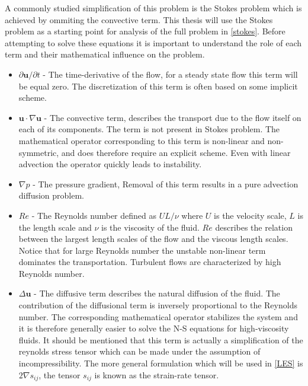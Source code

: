 A commonly studied simplification of this problem is the Stokes problem which
is achieved by ommiting the convective term. This thesis will use the Stokes 
problem as a starting point for analysis of the full problem in \cref{stokes}.
Before attempting to solve these equations it is important to understand the role of each term 
and their mathematical influence on the problem. 
\begin{itemize}
    \item $\partial \mathbf{u} /\partial t$
     - The time-derivative of the flow, for a steady state flow this term will be equal zero.
             The discretization of this term is often based on some implicit scheme. 
    \item $\mathbf{u} \cdot \nabla \mathbf{u}$
     - The convective term, describes the transport due to the flow itself on each of its components. 
    The term is not present in Stokes problem.
    The mathematical operator corresponding to this term is non-linear and non-symmetric, and does therefore require an explicit scheme. 
    Even with linear advection the operator quickly leads to instability. 

    \item $\nabla p$
    - The pressure gradient, Removal of this term results in a pure advection diffusion problem.

    \item $Re$ 
    - The Reynolds number defined as $UL/\nu$ where $U$ is the velocity scale, $L$ is the length scale and $\nu$ 
      is the viscosity of the fluid. $Re$ describes the relation between the largest length scales of the flow
      and the viscous length scales. Notice that for large Reynolds number the unstable non-linear term 
      dominates the transportation. Turbulent flows are characterized by high Reynolds number.

    \item $\Delta \mathbf{u}$ 
    - The diffusive term describes the natural diffusion of the fluid. The contribution of the diffusional term 
    is inversely proportional to the Reynolds number.
    The corresponding mathematical operator stabilizes the system and it is therefore generally easier
    to solve the N-S equations for high-viscosity fluids. It should be mentioned that this term is actually a simplification 
    of the reynolds stress tensor which can be made under the assumption of incompressibility. The more general formulation which 
    will be used in \cref{LES} is $2 \nabla s_{ij}$, the tensor $s_{ij}$ is known as the strain-rate tensor. 


\end{itemize}
